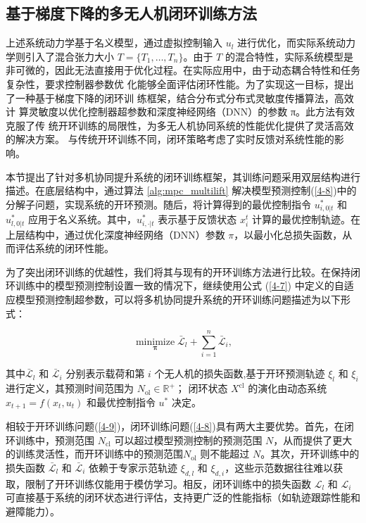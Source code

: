 \documentclass[lang=chs, degree=master, blindreview=false, winfonts=true]{yanputhesis}
\begin{document}
\subsection{基于梯度下降的多无人机闭环训练方法}
上述系统动力学基于名义模型，通过虚拟控制输入 \( u_l \) 进行优化，而实际系统动力学则引入了混合张力大小 \( T = \{T_1, \dots, T_n\} \)。由于 \( T \) 的混合特性，实际系统模型是非可微的，因此无法直接用于优化过程。在实际应用中，由于动态耦合特性和任务复杂性，要求控制器参数优
化能够全面评估闭环性能。为了实现这一目标，提出了一种基于梯度下降的闭环训
练框架，结合分布式分布式灵敏度传播算法，高效计
算灵敏度以优化控制器超参数和深度神经网络（DNN）的参数 π。此方法有效克服了传
统开环训练的局限性，为多无人机协同系统的性能优化提供了灵活高效的解决方案。
与传统开环训练不同，闭环策略考虑了实时反馈对系统性能的影响。

本节提出了针对多机协同提升系统的闭环训练框架，其训练问题采用双层结构进行描述。在底层结构中，通过算法 \ref{alg:mpc_multilift} 解决模型预测控制(\ref{4-8})中的分解子问题，实现系统的开环预测。随后，将计算得到的最优控制指令 \( u^*_{i,0|t} \) 和 \( u^*_{l,0|t} \) 应用于名义系统。其中，\( u^*_{i,\cdot|t} \) 表示基于反馈状态 \( x_i^t \) 计算的最优控制轨迹。在上层结构中，通过优化深度神经网络（DNN）参数 \( \pi \)，以最小化总损失函数，从而评估系统的闭环性能。

为了突出闭环训练的优越性，我们将其与现有的开环训练方法进行比较。在保持闭环训练中的模型预测控制设置一致的情况下，继续使用公式 (\ref{4-7}) 中定义的自适应模型预测控制超参数，可以将多机协同提升系统的开环训练问题描述为以下形式：

\begin{equation}
	\label{4-9}
\operatorname*{minimize}_{\bm{\pi}}  \bar{\mathcal{L}}_l + \sum_{i=1}^n \bar{\mathcal{L}}_i,
\end{equation}

其中\( \bar{\mathcal{L}}_l \) 和 \( \bar{\mathcal{L}}_i \) 分别表示载荷和第 $i$ 个无人机的损失函数,基于开环预测轨迹 $\xi_l$ 和 $\xi_i$ 进行定义，其预测时间范围为 \( N_\text{ol} \in \mathbb{R}^+ \)；
闭环状态 $X^\text{cl}$ 的演化由动态系统 $x_{t+1} = f(x_t, u_t)$ 和最优控制指令 $u^*$ 决定。

相较于开环训练问题(\ref{4-9})，闭环训练问题(\ref{4-8})具有两大主要优势。首先，在闭环训练中，预测范围 \( N_\text{cl} \) 可以超过模型预测控制的预测范围 \( N \)，从而提供了更大的训练灵活性，而开环训练中的预测范围\( N_\text{ol} \) 则不能超过 \( N \)。其次，开环训练中的损失函数 \( \bar{\mathcal{L}}_l \) 和 \( \bar{\mathcal{L}}_i \) 依赖于专家示范轨迹 \( \xi_{d,l} \) 和 \( \xi_{d,i} \)，这些示范数据往往难以获取，限制了开环训练仅能用于模仿学习。相反，闭环训练中的损失函数 \( \mathcal{L}_l \) 和 \( \mathcal{L}_i \) 可直接基于系统的闭环状态进行评估，支持更广泛的性能指标（如轨迹跟踪性能和避障能力）。
\end{document}
